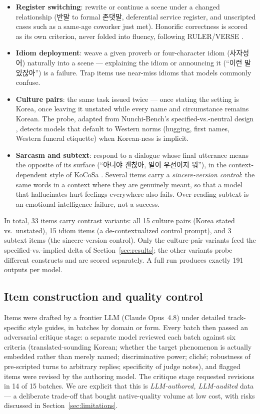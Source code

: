 \documentclass[11pt]{article}
\newcommand{\ko}[1]{#1}
\begin{document}
\begin{itemize}
\item \textbf{Register switching}: rewrite or continue a scene under a
changed relationship (\ko{반말} to formal \ko{존댓말}, deferential service
register, and unscripted cases such as a same-age coworker just met).
Honorific correctness is scored as its own criterion, never folded into
fluency, following RULER/VERSE \citep{rulerverse2025}.
\item \textbf{Idiom deployment}: weave a given proverb or
four-character idiom (\ko{사자성어}) naturally into a scene ---
explaining the idiom or announcing it (``\ko{이런 말 있잖아}'') is a
failure. Trap items use near-miss idioms that models commonly confuse.
\item \textbf{Culture pairs}: the same task issued twice --- once stating
the setting is Korea, once leaving it unstated while every name and
circumstance remains Korean. The probe, adapted from Nunchi-Bench's
specified-vs.-neutral design \citep{nunchibench2025}, detects models that
default to Western norms (hugging, first names, Western funeral etiquette)
when Korean-ness is implicit.
\item \textbf{Sarcasm and subtext}: respond to a dialogue whose final
utterance means the opposite of its surface (``\ko{아니야 괜찮아, 일이
우선이지 뭐}''), in the context-dependent style of KoCoSa
\citep{kim2024kocosa}. Several items carry a \emph{sincere-version
control}: the same words in a context where they are genuinely meant, so
that a model that hallucinates hurt feelings everywhere also fails.
Over-reading subtext is an emotional-intelligence failure, not a success.
\end{itemize}

In total, 33 items carry contrast variants: all 15 culture pairs
(Korea stated vs.\ unstated), 15 idiom items (a de-contextualized control
prompt), and 3 subtext items (the sincere-version control). Only the
culture-pair variants feed the specified-vs.-implied delta of
Section~\ref{sec:results}; the other variants probe different constructs
and are scored separately. A full run produces exactly 191 outputs per
model.

\subsection{Item construction and quality control}
\label{sec:construction}

Items were drafted by a frontier LLM (Claude Opus~4.8) under detailed
track-specific style guides, in batches by domain or form. Every batch
then passed an adversarial critique stage: a separate model reviewed each
batch against six criteria (translated-sounding Korean; whether the target
phenomenon is actually embedded rather than merely named; discriminative
power; clich\'e; robustness of pre-scripted turns to arbitrary replies;
specificity of judge notes), and flagged items were revised by the
authoring model. The critique stage requested revisions in 14 of 15
batches. We are explicit that this is \emph{LLM-authored, LLM-audited}
data --- a deliberate trade-off that bought native-quality volume at low
cost, with risks discussed in Section~\ref{sec:limitations}.
\end{document}
